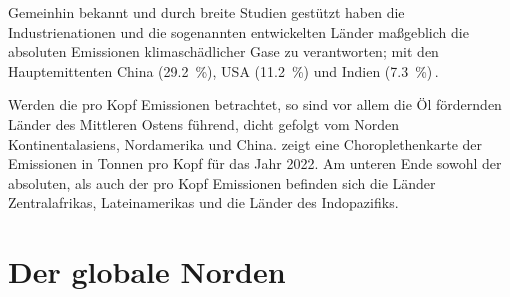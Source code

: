 Gemeinhin bekannt und durch breite Studien gestützt haben die Industrienationen und die sogenannten entwickelten Länder maßgeblich die absoluten Emissionen klimaschädlicher Gase zu verantworten; mit den Hauptemittenten China (\qty{29,2}{\percent}), USA (\qty{11,2}{\percent}) und Indien (\qty{7,3}{\percent})\,\cite{Misc.Centre.GHGEmissionsOfAllWorldCountries.2023}.

{%
\vspace{\baselineskip}
\centering

\label{fig:ghg per kopf}
\vspace{\baselineskip}
}

Werden die pro Kopf Emissionen betrachtet, so sind vor allem die Öl fördernden Länder des Mittleren Ostens führend, dicht gefolgt vom Norden Kontinentalasiens, Nordamerika und China.
 zeigt eine Choroplethenkarte der Emissionen in Tonnen pro Kopf für das Jahr 2022.
Am unteren Ende sowohl der absoluten, als auch der pro Kopf Emissionen befinden sich die Länder Zentralafrikas, Lateinamerikas und die Länder des Indopazifiks.
%
\section{Der globale Norden}

\cite{Misc.ReitisMuenstermann.MonitoringClimateChangeAndCOP28InEuropeanOnlineNewsMedia.2024}

